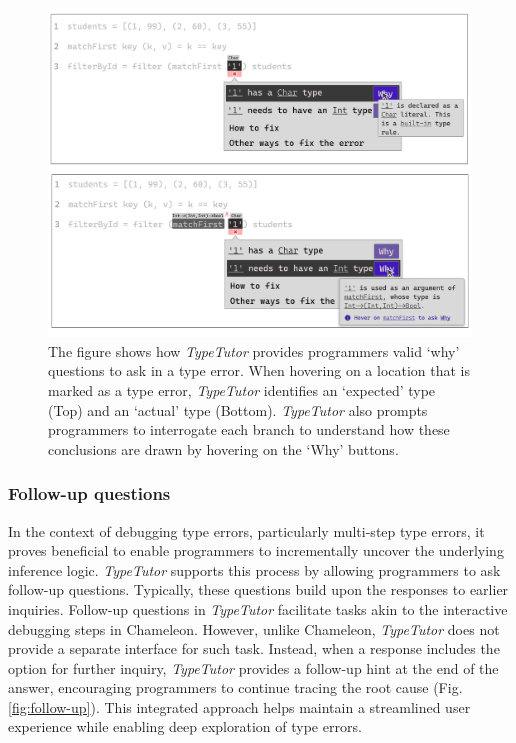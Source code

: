 \begin{figure}[hbt]
  \includegraphics[width=\linewidth]{Why}
  \caption{
      \label{fig:why}
      The figure shows how \textit{TypeTutor} provides programmers valid `why' questions to ask in a type error. When hovering on a location that is marked as a type error, \textit{TypeTutor} identifies an `expected' type (Top) and an `actual' type (Bottom). \textit{TypeTutor} also prompts programmers to interrogate each branch to understand how these conclusions are drawn by hovering on the `Why' buttons. 
    }
\end{figure}



\subsubsection{Follow-up questions}

In the context of debugging type errors, particularly multi-step type errors, it proves beneficial to enable programmers to incrementally uncover the underlying inference logic. \textit{TypeTutor} supports this process by allowing programmers to ask follow-up questions. Typically, these questions build upon the responses to earlier inquiries. Follow-up questions in \textit{TypeTutor} facilitate tasks akin to the interactive debugging steps in Chameleon. However, unlike Chameleon, \textit{TypeTutor} does not provide a separate interface for such task. Instead, when a response includes the option for further inquiry, \textit{TypeTutor} provides a follow-up hint at the end of the answer, encouraging programmers to continue tracing the root cause (Fig. \ref{fig:follow-up}). This integrated approach helps maintain a streamlined user experience while enabling deep exploration of type errors.


